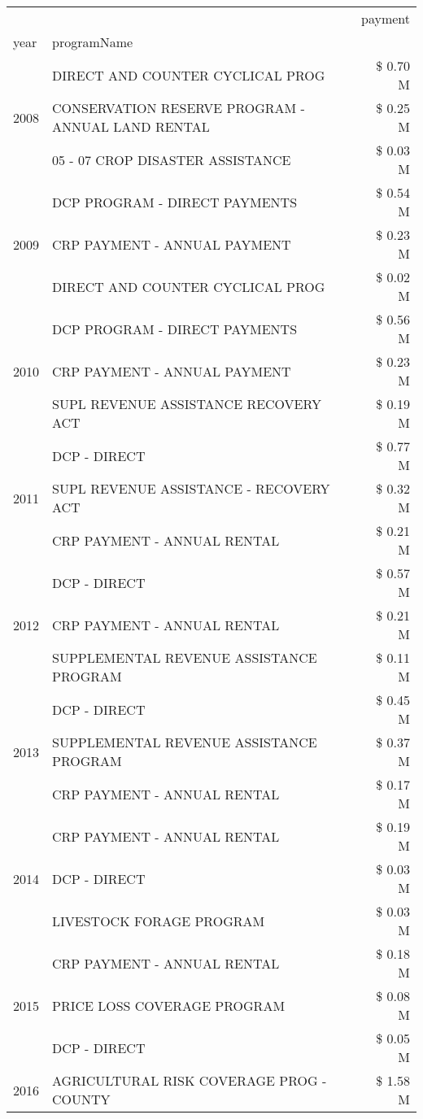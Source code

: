 \begin{tabular}{llr}
\toprule
 &  & payment \\
year & programName &  \\
\midrule
\multirow[t]{3}{*}{2008} & DIRECT AND COUNTER CYCLICAL PROG & \$ 0.70 M \\
 & CONSERVATION RESERVE PROGRAM - ANNUAL LAND RENTAL & \$ 0.25 M \\
 & 05 - 07 CROP DISASTER ASSISTANCE & \$ 0.03 M \\
\cline{1-3}
\multirow[t]{3}{*}{2009} & DCP PROGRAM - DIRECT PAYMENTS & \$ 0.54 M \\
 & CRP PAYMENT - ANNUAL PAYMENT & \$ 0.23 M \\
 & DIRECT AND COUNTER CYCLICAL PROG & \$ 0.02 M \\
\cline{1-3}
\multirow[t]{3}{*}{2010} & DCP PROGRAM - DIRECT PAYMENTS & \$ 0.56 M \\
 & CRP PAYMENT - ANNUAL PAYMENT & \$ 0.23 M \\
 & SUPL REVENUE ASSISTANCE RECOVERY ACT & \$ 0.19 M \\
\cline{1-3}
\multirow[t]{3}{*}{2011} & DCP - DIRECT & \$ 0.77 M \\
 & SUPL REVENUE ASSISTANCE - RECOVERY ACT & \$ 0.32 M \\
 & CRP PAYMENT - ANNUAL RENTAL & \$ 0.21 M \\
\cline{1-3}
\multirow[t]{3}{*}{2012} & DCP - DIRECT & \$ 0.57 M \\
 & CRP PAYMENT - ANNUAL RENTAL & \$ 0.21 M \\
 & SUPPLEMENTAL REVENUE ASSISTANCE PROGRAM & \$ 0.11 M \\
\cline{1-3}
\multirow[t]{3}{*}{2013} & DCP - DIRECT & \$ 0.45 M \\
 & SUPPLEMENTAL REVENUE ASSISTANCE PROGRAM & \$ 0.37 M \\
 & CRP PAYMENT - ANNUAL RENTAL & \$ 0.17 M \\
\cline{1-3}
\multirow[t]{3}{*}{2014} & CRP PAYMENT - ANNUAL RENTAL & \$ 0.19 M \\
 & DCP - DIRECT & \$ 0.03 M \\
 & LIVESTOCK FORAGE PROGRAM & \$ 0.03 M \\
\cline{1-3}
\multirow[t]{3}{*}{2015} & CRP PAYMENT - ANNUAL RENTAL & \$ 0.18 M \\
 & PRICE LOSS COVERAGE PROGRAM & \$ 0.08 M \\
 & DCP - DIRECT & \$ 0.05 M \\
\cline{1-3}
\multirow[t]{3}{*}{2016} & AGRICULTURAL RISK COVERAGE PROG - COUNTY      & \$ 1.58 M \\

\end{tabular}
